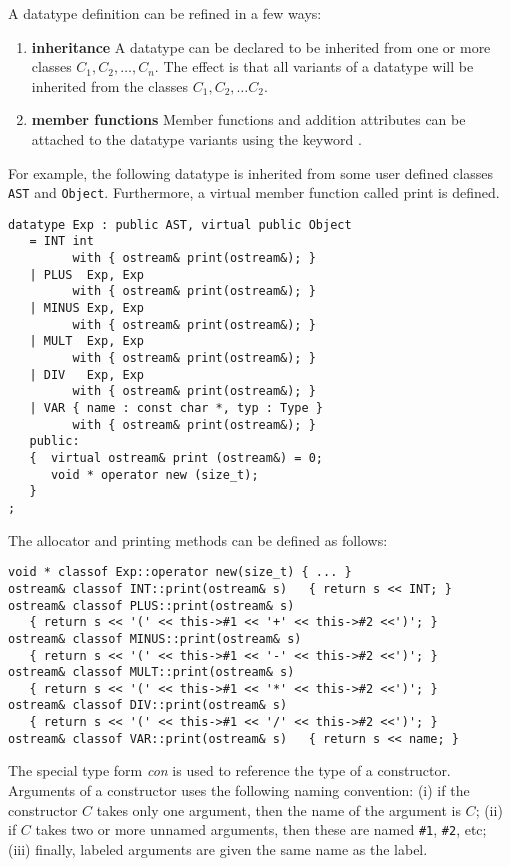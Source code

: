 
   A datatype definition can be refined in a few ways:

\begin{enumerate}
  \item{\bf inheritance} A datatype can be declared to be inherited from
one or more classes $C_1, C_2, \ldots, C_n$. 
The effect is that all variants of a datatype will be inherited from the 
classes $C_1, C_2, \ldots C_2$.  

  \item{\bf member functions}  Member functions and addition attributes
can be attached to the datatype variants using the keyword .
\end{enumerate}

For example, the following datatype  is inherited from some user
defined classes \verb|AST| and \verb|Object|.   Furthermore, a virtual
member function called print is defined.  

\begin{verbatim}
datatype Exp : public AST, virtual public Object
   = INT int        
         with { ostream& print(ostream&); }
   | PLUS  Exp, Exp 
         with { ostream& print(ostream&); }
   | MINUS Exp, Exp 
         with { ostream& print(ostream&); }
   | MULT  Exp, Exp 
         with { ostream& print(ostream&); }
   | DIV   Exp, Exp 
         with { ostream& print(ostream&); }
   | VAR { name : const char *, typ : Type }
         with { ostream& print(ostream&); }
   public:
   {  virtual ostream& print (ostream&) = 0;
      void * operator new (size_t);
   }
;
\end{verbatim}

The allocator and printing methods can be defined as follows:
\begin{verbatim}
void * classof Exp::operator new(size_t) { ... }
ostream& classof INT::print(ostream& s)   { return s << INT; }
ostream& classof PLUS::print(ostream& s)  
   { return s << '(' << this->#1 << '+' << this->#2 <<')'; }
ostream& classof MINUS::print(ostream& s) 
   { return s << '(' << this->#1 << '-' << this->#2 <<')'; }
ostream& classof MULT::print(ostream& s)  
   { return s << '(' << this->#1 << '*' << this->#2 <<')'; }
ostream& classof DIV::print(ostream& s)  
   { return s << '(' << this->#1 << '/' << this->#2 <<')'; }
ostream& classof VAR::print(ostream& s)   { return s << name; }
\end{verbatim}

The special type form  {\em con} is used to reference
the type of a constructor.  Arguments of a constructor uses the following
naming convention: (i) if the constructor $C$ takes only one argument,
then the name of the argument is $C$; (ii) if $C$ takes two or more
unnamed arguments, then these are named \verb|#1|, \verb|#2|, etc;
(iii) finally, labeled arguments are given the same name as the label.

